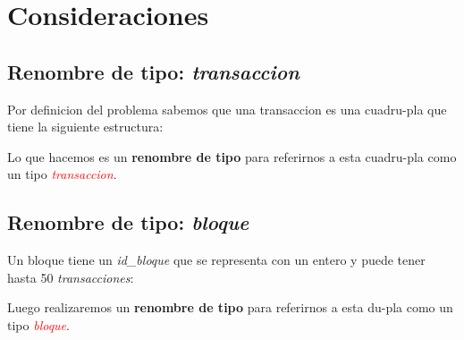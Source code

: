 \documentclass[10pt,a4paper]{article}
\begin{document}
\maketitle

\section{Consideraciones}
\subsection{Renombre de tipo: \textit{transaccion}}
Por definicion del problema sabemos que una transaccion es una cuadru-pla que tiene la siguiente estructura:

\vspace{0.3cm}
\noindent
{}
\vspace{0.1cm}

Lo que hacemos es un \textbf{renombre de tipo} para referirnos a esta cuadru-pla como un tipo \textcolor{red}{\textit{transaccion}}.

\subsection{Renombre de tipo: \textit{bloque}}
Un bloque tiene un \textit{id\_bloque} que se representa con un entero y puede tener hasta 50 \textit{transacciones}:

\vspace{0.3cm}
\noindent
{}
\vspace{0.1cm}

Luego realizaremos un \textbf{renombre de tipo} para referirnos a esta du-pla como un tipo \textcolor{red}{\textit{bloque}}.

\vspace{0.3cm}
\noindent
{}
\end{document}
